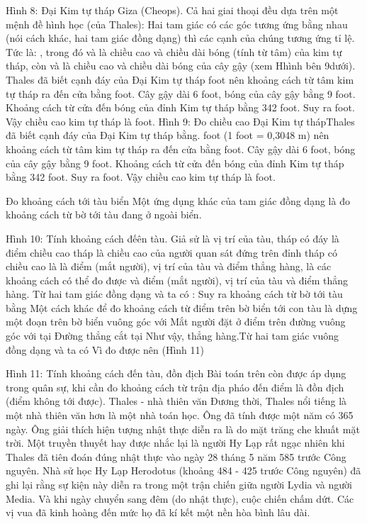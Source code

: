 \begin{multicols}{2}
{	Hình 8: Đại Kim tự tháp Giza (Cheops).
	Cả hai giai thoại đều dựa trên một mệnh đề hình học (của Thales): Hai tam giác có các góc tương ứng  bằng nhau (nói cách khác, hai tam giác đồng dạng) thì các cạnh của chúng tương ứng tỉ lệ. Tức là:    
	,
	trong đó    và    là chiều cao và chiều dài bóng (tính từ tâm) của kim tự tháp, còn    và    là chiều cao và chiều dài bóng của cây gậy (xem Hhình bên 9dưới). 
	Thales đã biết cạnh đáy của Đại Kim tự tháp   foot nên khoảng cách từ tâm kim tự tháp ra đến cửa bằng    foot. Cây gậy dài 6 foot, bóng của cây gậy bằng 9 foot. Khoảng cách từ cửa đến bóng của đỉnh Kim tự tháp bằng 342 foot. Suy ra  foot. Vậy chiều cao kim tự tháp là 
	foot.
	Hình 9: Đo chiều cao Đại Kim tự thápThales đã biết cạnh đáy của Đại Kim tự tháp bằng.  foot (1 foot = 0,3048 m) nên khoảng cách từ tâm kim tự tháp ra đến cửa bằng  foot. Cây gậy dài 6 foot, bóng của cây gậy bằng 9 foot. Khoảng cách từ cửa đến bóng của đỉnh Kim tự tháp bằng 342 foot. Suy ra foot. Vậy chiều cao kim tự tháp là foot.
	
	
	
	Đo khoảng cách tới tàu biển 
	Một ứng dụng khác của tam giác đồng dạng là đo khoảng cách từ bờ tới tàu đang ở ngoài biển. 
	
	Hình 10: Tính khoảng cách đếên tàu.
	Giả sử    là vị trí của tàu,  tháp có đáy là điểm  chiều cao tháp là   chiều cao của người quan sát đứng trên đỉnh tháp có chiều cao là là    điểm   (mắt người), vị trí   của tàu và điểm  thẳng hàng,     là các khoảng cách có thể đo được và điểm   (mắt người), vị trí   của tàu và điểm   thẳng hàng. Từ hai tam giác đồng dạng    và     ta có  :  Suy ra khoảng cách
	từ bờ tới tàu bằng   
	Một cách khác để đo khoảng cách từ điểm   trên bờ biển tới con tàu   là dựng một đoạn   trên bờ biển vuông góc với  Mắt người đặt ở điểm  trên đường vuông góc với   tại   Đường thẳng   cắt  tại   Như vậy,   thẳng hàng.Từ hai tam giác vuông đồng dạng   và   ta có   
	Vì      đo được nên  (Hình 11)
	
	
	Hình 11: Tính khoảng cách đến tàu, đồn địch
	Bài toán trên còn được áp dụng trong quân sự, khi cần đo khoảng cách từ trận địa pháo đến điểm  là đồn địch (điểm không tới được).
	Thales - nhà thiên văn 
	Đương thời, Thales nổi tiếng là một nhà thiên văn hơn là một nhà toán học. Ông đã tính được một năm có 365 ngày. Ông giải thích hiện tượng nhật thực diễn ra là do mặt trăng che khuất mặt trời. Một truyền thuyết hay được nhắc lại là người Hy Lạp rất ngạc nhiên khi Thales đã tiên đoán đúng nhật thực vào ngày 28 tháng 5 năm 585 trước Công nguyên. Nhà sử học Hy Lạp Herodotus (khoảng 484 - 425 trước Công nguyên) đã ghi lại rằng sự kiện này diễn ra trong một trận chiến giữa người Lydia và người Media. Và khi ngày chuyển sang đêm (do nhật thực), cuộc chiến chấm dứt. Các vị vua đã kinh hoàng đến mức họ đã kí kết một nền hòa bình lâu dài.
	
}
\end{multicols}
